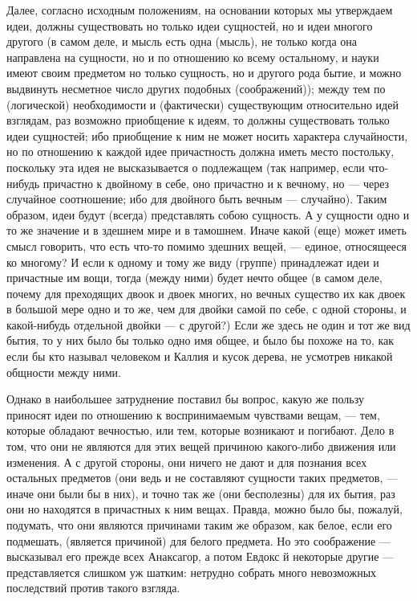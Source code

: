 \documentclass{article}
\begin{document}
Далее, согласно исходным положениям, на основании которых мы утверждаем идеи, должны существовать но только идеи сущностей, но и идеи многого другого (в самом деле, и мысль есть одна (мысль), не только когда она направлена на сущности, но и по отношению ко всему остальному, и науки имеют своим предметом но только сущность, но и другого рода бытие, и можно выдвинуть несметное число других подобных (соображений)); между тем по (логической) необходимости и (фактически) существующим относительно идей взглядам, раз возможно приобщение к идеям, то должны существовать только идеи сущностей; ибо приобщение к ним не может носить характера случайности, но по отношению к каждой идее причастность должна иметь место постольку, поскольку эта идея не высказывается о подлежащем
\footnotemark[10]
(так например, если что-нибудь причастно к двойному в себе,
\footnotemark[11]
оно причастно и к вечному, но — через случайное соотношение; ибо для двойного быть вечным — случайно). Таким образом, идеи будут (всегда) представлять собою сущность.
\footnotemark[12]
А у сущности одно и то же значение и в здешнем мире и в тамошнем. Иначе какой (еще) может иметь смысл говорить, что есть что-то помимо здешних вещей, — единое, относящееся ко многому? И если к одному и тому же виду (группе) принадлежат идеи и причастные им вощи, тогда (между ними) будет нечто общее (в самом деле, почему для преходящих двоок и двоек многих, но вечных
\footnotemark[13]
существо их как двоек в большой мере одно и то же, чем для двойки самой по себе, с одной стороны, и какой-нибудь отдельной двойки — с другой?) Если же здесь не один и тот же вид  бытия, то у них было бы только одно имя общее, и было бы похоже на то, как если бы кто называл человеком и Каллия и кусок дерева, не усмотрев никакой общности между ними.

Однако в наибольшее затруднение поставил бы вопрос, какую же пользу приносят идеи по отношению к воспринимаемым чувствами вещам, — тем, которые обладают вечностью,
\footnotemark[14]
или тем, которые возникают и погибают. Дело в том, что они не являются для этих вещей причиною какого-либо движения или изменения. А с другой стороны, они ничего не дают и для познания всех остальных предметов (они ведь и не составляют сущности таких предметов, — иначе они были бы в них), и точно так же (они бесполезны) для их бытия, раз они но находятся в причастных к ним вещах. Правда, можно было бы, пожалуй, подумать, что они являются причинами таким же образом, как белое, если его подмешать, (является причиной) для белого предмета. Но это соображение — высказывал его прежде всех Анаксагор, а потом Евдокс й некоторые другие — представляется слишком уж шатким: нетрудно собрать много невозможных последствий против такого взгляда.
\end{document}
